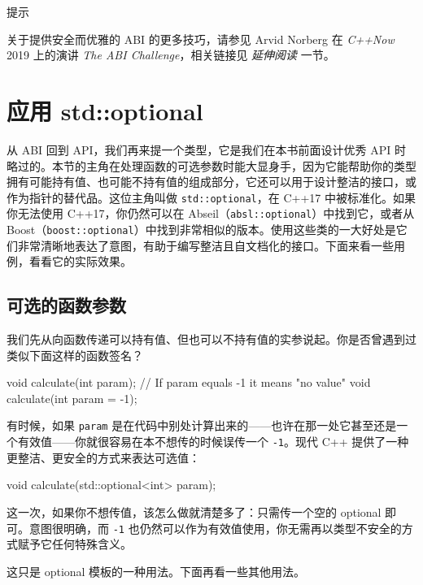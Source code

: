 \begin{myTip}{提示}

关于提供安全而优雅的 ABI 的更多技巧，请参见 Arvid Norberg 在 \emph{C++Now} 2019 上的演讲 \emph{The ABI Challenge}，相关链接见 \emph{延伸阅读} 一节。
\end{myTip}

\section{应用 std::optional}

\label{idx:466}
\label{idx:467}
从 ABI 回到 API，我们再来提一个类型，它是我们在本书前面设计优秀 API 时略过的。本节的主角在处理函数的可选参数时能大显身手，因为它能帮助你的类型拥有可能持有值、也可能不持有值的组成部分，它还可以用于设计整洁的接口，或作为指针的替代品。这位主角叫做 \texttt{std::\allowbreak{}optional}，在 C++17 中被标准化。如果你无法使用 C++17，你仍然可以在 Abseil（\texttt{absl::\allowbreak{}optional}）中找到它，或者从 Boost（\texttt{boost::\allowbreak{}optional}）中找到非常相似的版本。使用这些类的一大好处是它们非常清晰地表达了意图，有助于编写整洁且自文档化的接口。下面来看一些用例，看看它的实际效果。

\subsection{可选的函数参数}

\label{idx:468}
我们先从向函数传递可以持有值、但也可以不持有值的实参说起。你是否曾遇到过类似下面这样的函数签名？

\begin{codebox}[text]
void calculate(int param); // If param equals -1 it means "no value"
void calculate(int param = -1);
\end{codebox}

有时候，如果 \texttt{param} 是在代码中别处计算出来的——也许在那一处它甚至还是一个有效值——你就很容易在本不想传的时候误传一个 \texttt{-1}。现代 C++ 提供了一种更整洁、更安全的方式来表达可选值：

\begin{codebox}[cpp]
void calculate(std::optional<int> param);
\end{codebox}

这一次，如果你不想传值，该怎么做就清楚多了：只需传一个空的 optional 即可。意图很明确，而 \texttt{-1} 也仍然可以作为有效值使用，你无需再以类型不安全的方式赋予它任何特殊含义。

这只是 optional 模板的一种用法。下面再看一些其他用法。

